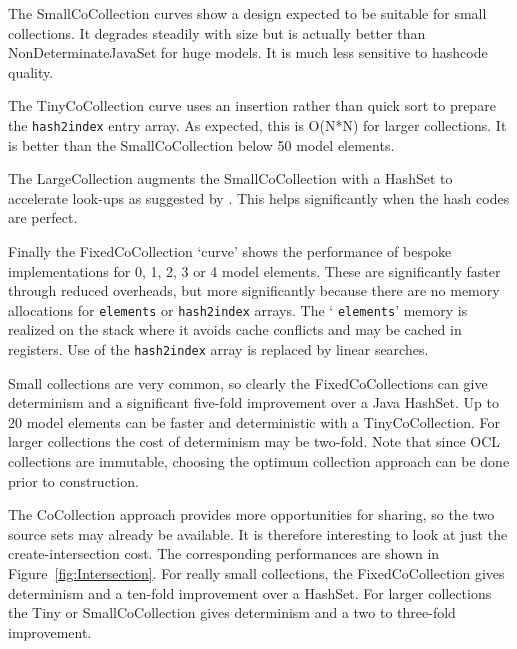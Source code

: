 \documentclass[
]{ceurart}
\begin{document}
The SmallCoCollection curves show a design expected to be suitable for small collections. It degrades steadily with size but is actually better than NonDeterminateJavaSet for huge models. It is much less sensitive to hashcode quality.

The TinyCoCollection curve uses an insertion rather than quick sort to prepare the \verb!hash2index! entry array. As expected, this is O(N*N) for larger collections. It is better than the SmallCoCollection below 50 model elements.

The LargeCollection augments the SmallCoCollection with a HashSet to accelerate look-ups as suggested by \cite{willink2017deterministic}. This helps significantly when the hash codes are perfect.

Finally the FixedCoCollection `curve' shows the performance of bespoke implementations for 0, 1, 2, 3 or 4 model elements. These are significantly faster through reduced overheads, but more significantly because there are no memory allocations for \verb!elements! or \verb!hash2index! arrays. The ` \verb!elements!' memory is realized on the stack where it avoids cache conflicts and may be cached in registers. Use of the \verb!hash2index! array is replaced by linear searches.

Small collections are very common, so clearly the FixedCoCollections can give determinism and a significant five-fold improvement over a Java HashSet.  Up to 20 model elements can be faster and deterministic with a TinyCoCollection. For larger collections the cost of determinism may be two-fold. Note that since OCL collections are immutable, choosing the optimum collection approach can be done prior to construction.

The CoCollection approach provides more opportunities for sharing, so the two source sets may already be available. It is therefore interesting to look at just the create-intersection cost. The corresponding performances are shown in Figure~\ref{fig:Intersection}. For really small collections, the FixedCoCollection gives determinism and a ten-fold improvement over a HashSet. For larger collections the Tiny or SmallCoCollection gives determinism and a two to three-fold improvement.
\end{document}
